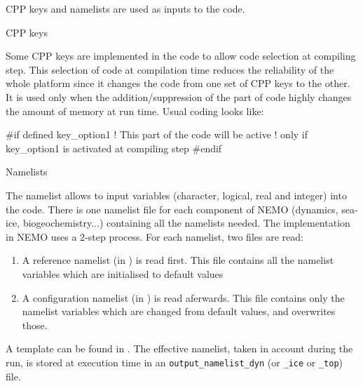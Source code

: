 \documentclass[../main/NEMO_manual]{subfiles}
\begin{document}
\noindent CPP keys and namelists are used as inputs to the code.

\noindent {} CPP keys

Some CPP keys are implemented in the \fortran code to allow code selection at compiling step.
This selection of code at compilation time reduces the reliability of the whole platform since
it changes the code from one set of CPP keys to the other.
It is used only when the addition/suppression of the part of code highly changes the amount of memory at run time.
Usual coding looks like: 

\begin{forlines}
#if defined key_option1
	! This part of the \fortran code will be active
	! only if key_option1 is activated at compiling step
#endif
\end{forlines}

\noindent {} Namelists

The namelist allows to input variables (character, logical, real and integer) into the code.
There is one namelist file for each component of NEMO (dynamics, sea-ice, biogeochemistry...)
containing all the \fortran namelists needed.
The implementation in NEMO uses a 2-step process. 
For each \fortran namelist, two files are read:

\begin{enumerate}
\item
  A reference namelist (in ) is read first.
  This file contains all the namelist variables which are initialised to default values
\item
  A configuration namelist (in ) is read aferwards.
  This file contains only the namelist variables which are changed from default values, and overwrites those.
\end{enumerate}
A template can be found in .
The effective namelist, taken in account during the run, is stored at execution time in
an \texttt{output\_namelist\_dyn} (or \texttt{\_ice} or \texttt{\_top}) file.
\end{document}
